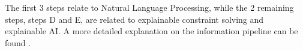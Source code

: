 The first 3 steps relate to Natural Language Processing, while the 2 remaining steps, steps D and E, are related to explainable constraint solving and explainable AI. A more detailed explanation on the information pipeline can be found \cite{pip:claesuser}.

%
%
%
%
%
